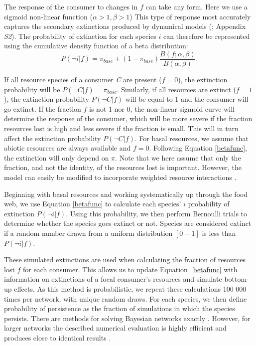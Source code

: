 \documentclass[12pt]{article}
\begin{document}
\begin{spacing}{2.0}
        
        The response of the consumer to changes in $f$ can take any form. Here we use a sigmoid non-linear function ($\alpha > 1, \beta > 1$) 
		This type of response most accurately captures the secondary extinctions produced by dynamical models (\citealp[]{Eklof2013}; Appendix \emph{S2}).
		The probability of extinction for each species $i$ can therefore be represented using the cumulative density function of a beta distribution:
		\begin{equation}
		P(\lnot i|f) = \pi_{base} + (1 - \pi_{base}) \frac{B(f;\alpha,\beta)}{B(\alpha,\beta)}.
				\label{betafunc}
        \end{equation}
		
		If all resource species of a consumer \textit{C} are present ($f = 0$), the extinction probability will be $P(\lnot C|f) = \pi_{base}$. 
		Similarly, if all resources are extinct ($f = 1$), the extinction probability $P(\lnot C|f)$ will be equal to 1 and the consumer will go extinct.
		If the fraction $f$ is not 1 nor 0, the non-linear sigmoid curve will determine the response of the consumer, which will be more severe if the fraction resources lost is high and less severe if the fraction is small. This will in turn affect the extinction probability $P(\lnot C|f)$.
		For basal resources, we assume that abiotic resources are always available and $f=0$. Following Equation \ref{betafunc}, the extinction will only depend on $\pi$.
		Note that we here assume that only the fraction, and not the identity, of the resources lost is important. 
		However, the model can easily be modified to incorporate weighted resource interactions \citep[see][]{Eklof2013}.
		
		
        Beginning with basal resources and working systematically up through the food web, we use Equation \ref{betafunc} to calculate each species' $i$ probability of extinction $P(\lnot i|f)$.
        Using this probability, we then perform Bernoulli trials to determine whether the species goes extinct or not. 
        Species are considered extinct if a random number drawn from a uniform distribution $[0-1]$ is less than $P(\lnot i|f)$.


        These simulated extinctions are used when calculating the fraction of resources lost $f$ for each consumer.
        This allows us to update Equation~\ref{betafunc} with information on extinctions of a focal consumer's resources and simulate bottom-up effects. As this method is probabilistic, we repeat these calculations 100 000 times per network, with unique random draws.
	    For each species, we then define probability of persistence as the fraction of simulations in which the species persists. There are methods for solving Bayesian networks exactly \citep{Eklof2013}.
	    However, for larger networks the described numerical evaluation is highly efficient and produces close to identical results \citep{Haussler2020}.
		

\end{spacing}
\end{document}
